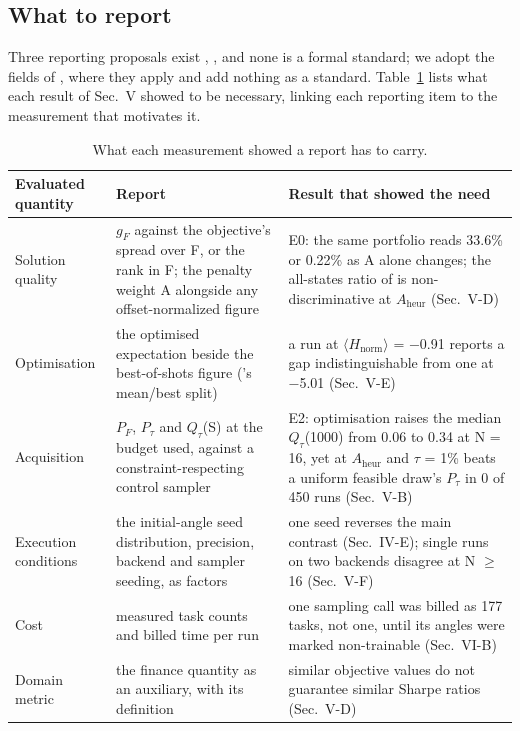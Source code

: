 \documentclass{ieeeaccess}
\begin{document}
\subsection{What to report}


Three reporting proposals exist \cite{ref19}, \cite{ref20}, \cite{ref21} and none is a formal standard; we adopt the fields of \cite{ref19}, \cite{ref20} where they apply and add nothing as a standard. Table~\ref{tab:V} lists what each result of Sec.~V showed to be necessary, linking each reporting item to the measurement that motivates it.





\begin{table}[!t]
\centering
\scriptsize
\caption{What each measurement showed a report has to carry.}
\label{tab:V}
\begin{tabular}{p{}p{}p{}}
\toprule
Evaluated quantity & Report & Result that showed the need \\
\midrule
Solution quality & $g_{F}$ against the objective's spread over F, or the rank in F; the penalty weight A alongside any offset-normalized figure & E0: the same portfolio reads 33.6\% or 0.22\% as A alone changes; the all-states ratio of \cite{ref19} is non-discriminative at $A_{\mathrm{heur}}$ (Sec.~V-D) \\
Optimisation & the optimised expectation beside the best-of-shots figure (\cite{ref19}'s mean/best split) & a run at $\langle$$H_{\mathrm{norm}}$$\rangle$ = $-$0.91 reports a gap indistinguishable from one at $-$5.01 (Sec.~V-E) \\
Acquisition & $P_{F}$, $P_{\tau}$ and $Q_{\tau}$(S) at the budget used, against a constraint-respecting control sampler & E2: optimisation raises the median $Q_{\tau}$(1000) from 0.06 to 0.34 at N = 16, yet at $A_{\mathrm{heur}}$ and $\tau$ = 1\% beats a uniform feasible draw's $P_{\tau}$ in 0 of 450 runs (Sec.~V-B) \\
Execution conditions & the initial-angle seed distribution, precision, backend and sampler seeding, as factors & one seed reverses the main contrast (Sec.~IV-E); single runs on two backends disagree at N $\geq$ 16 (Sec.~V-F) \\
Cost & measured task counts and billed time per run & one sampling call was billed as 177 tasks, not one, until its angles were marked non-trainable (Sec.~VI-B) \\
Domain metric & the finance quantity as an auxiliary, with its definition & similar objective values do not guarantee similar Sharpe ratios (Sec.~V-D) \\
\bottomrule
\end{tabular}
\end{table}
\end{document}
